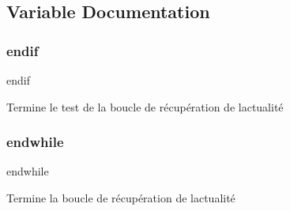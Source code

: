 \subsection{Variable Documentation}
\hypertarget{single-actualites_8php_a82cd33ca97ff99f2fcc5e9c81d65251b}{}\label{single-actualites_8php_a82cd33ca97ff99f2fcc5e9c81d65251b} 
\subsubsection{\texorpdfstring{endif}{endif}}
{\footnotesize\ttfamily endif}



Termine le test de la boucle de récupération de l\textquotesingle{}actualité 

\hypertarget{single-actualites_8php_a1b05dae45f9e3f4c1fe86048550d2c5b}{}\label{single-actualites_8php_a1b05dae45f9e3f4c1fe86048550d2c5b} 
\subsubsection{\texorpdfstring{endwhile}{endwhile}}
{\footnotesize\ttfamily endwhile}



Termine la boucle de récupération de l\textquotesingle{}actualité 

